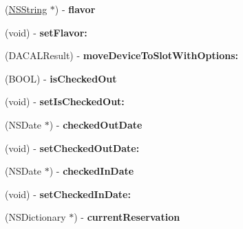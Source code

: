 \begin{DoxyCompactItemize}
\item 
\hypertarget{interface_d_a_c_a_l_slot_a1fa8b4002c0b7b352faae3367633e4f3}{
(\hyperlink{class_n_s_string}{NSString} $\ast$) -\/ {\bfseries flavor}}
\label{interface_d_a_c_a_l_slot_a1fa8b4002c0b7b352faae3367633e4f3}

\item 
\hypertarget{interface_d_a_c_a_l_slot_a387cb2f89493ac1e74d7f0f789e520c1}{
(void) -\/ {\bfseries setFlavor:}}
\label{interface_d_a_c_a_l_slot_a387cb2f89493ac1e74d7f0f789e520c1}

\item 
\hypertarget{interface_d_a_c_a_l_slot_a8b5837d044259637513b867a86b6328a}{
(DACALResult) -\/ {\bfseries moveDeviceToSlotWithOptions:}}
\label{interface_d_a_c_a_l_slot_a8b5837d044259637513b867a86b6328a}

\item 
\hypertarget{interface_d_a_c_a_l_slot_ab1515a3090a175c2512ba45321ac9d6e}{
(BOOL) -\/ {\bfseries isCheckedOut}}
\label{interface_d_a_c_a_l_slot_ab1515a3090a175c2512ba45321ac9d6e}

\item 
\hypertarget{interface_d_a_c_a_l_slot_a9865c85e84bfc35963c8285552481f9b}{
(void) -\/ {\bfseries setIsCheckedOut:}}
\label{interface_d_a_c_a_l_slot_a9865c85e84bfc35963c8285552481f9b}

\item 
\hypertarget{interface_d_a_c_a_l_slot_af9446ac6fc452d10060a6e40e231c5fb}{
(NSDate $\ast$) -\/ {\bfseries checkedOutDate}}
\label{interface_d_a_c_a_l_slot_af9446ac6fc452d10060a6e40e231c5fb}

\item 
\hypertarget{interface_d_a_c_a_l_slot_a836fa34eaa6534048444d109d51fa362}{
(void) -\/ {\bfseries setCheckedOutDate:}}
\label{interface_d_a_c_a_l_slot_a836fa34eaa6534048444d109d51fa362}

\item 
\hypertarget{interface_d_a_c_a_l_slot_a39bb5fec1bbb099e2a6a67adc62c7caa}{
(NSDate $\ast$) -\/ {\bfseries checkedInDate}}
\label{interface_d_a_c_a_l_slot_a39bb5fec1bbb099e2a6a67adc62c7caa}

\item 
\hypertarget{interface_d_a_c_a_l_slot_aab8a20dc053933e24a200553e9638179}{
(void) -\/ {\bfseries setCheckedInDate:}}
\label{interface_d_a_c_a_l_slot_aab8a20dc053933e24a200553e9638179}

\item 
\hypertarget{interface_d_a_c_a_l_slot_a944014708a461bf650835a94e252bb8b}{
(NSDictionary $\ast$) -\/ {\bfseries currentReservation}}
\label{interface_d_a_c_a_l_slot_a944014708a461bf650835a94e252bb8b}


\end{DoxyCompactItemize}
